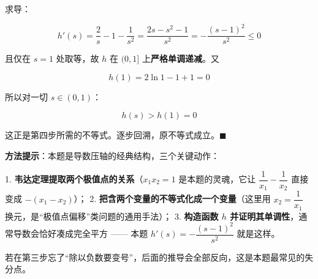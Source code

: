 \begin{answer}
求导：

\nopagebreak[4]
\[h'(s)=\frac2s-1-\frac1{s^{2}}=\frac{2s-s^{2}-1}{s^{2}}=-\frac{(s-1)^{2}}{s^{2}}\le0\]

且仅在 $s=1$ 处取等，故 $h$ 在 $(0,1]$ 上\textbf{严格单调递减}。又

\nopagebreak[4]
\[h(1)=2\ln1-1+1=0\]

所以对一切 $s\in(0,1)$：

\nopagebreak[4]
\[h(s)>h(1)=0\]

这正是第四步所需的不等式。逐步回溯，原不等式成立。$\blacksquare$

\begin{gktip}
\textbf{方法提示}：本题是导数压轴的经典结构，三个关键动作：

1. \textbf{韦达定理提取两个极值点的关系}（$x_1x_2=1$ 是本题的灵魂，它让 $\dfrac1{x_1}-\dfrac1{x_2}$ 直接变成 $-\left(x_1-x_2\right)$）；
2. \textbf{把含两个变量的不等式化成一个变量}（这里用 $x_2=\dfrac1{x_1}$ 换元，是“极值点偏移”类问题的通用手法）；
3. \textbf{构造函数 $h$ 并证明其单调性}，通常导数会恰好凑成完全平方 —— 本题 $h'(s)=-\dfrac{(s-1)^{2}}{s^{2}}$ 就是这样。

若在第三步忘了“除以负数要变号”，后面的推导会全部反向，这是本题最常见的失分点。
\end{gktip}



\par\medskip

\end{answer}

